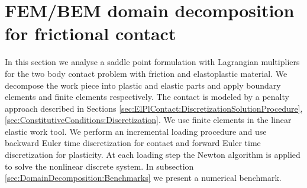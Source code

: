\section{FEM/BEM domain decomposition for frictional contact}\label{sec:ElPlContact:DomainDecomposition}

In this section we analyse a saddle point formulation with Lagrangian multipliers for the two body contact problem with friction and elastoplastic material. We decompose the work piece into plastic and elastic parts and apply boundary elements and finite elements respectively. The contact is modeled by a penalty approach described in  Sections \ref{sec:ElPlContact:DiscretizationSolutionProcedure}, \ref{sec:ConstitutiveConditions:Discretization}. We use finite elements in the linear elastic work tool. We perform an incremental loading procedure and use backward Euler time discretization for contact and forward Euler time discretization  for plasticity. At each loading step the Newton algorithm is applied to solve the nonlinear discrete system. In subsection \ref{sec:DomainDecomposition:Benchmarks} we present a numerical benchmark.


